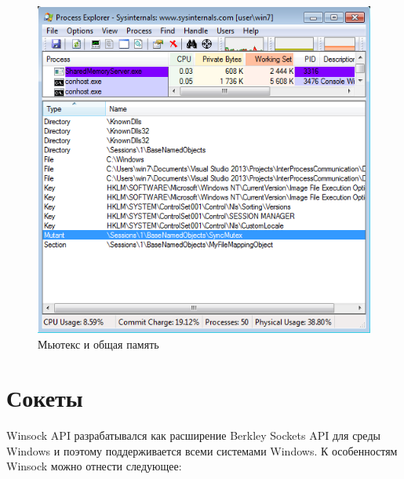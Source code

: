 \documentclass[a4paper, 12pt]{report}		%
\begin{document}
\begin{figure}[h!]
\centering
\includegraphics[scale=1]{res/09_Process_Explorer}
\caption{Мьютекс и общая память}
\end{figure}

\chapter*{Сокеты}

Winsock API разрабатывался как расширение Berkley Sockets API для среды Windows и поэтому поддерживается всеми системами Windows. К особенностям Winsock можно отнести следующее\cite{Hart}:
\end{document}
